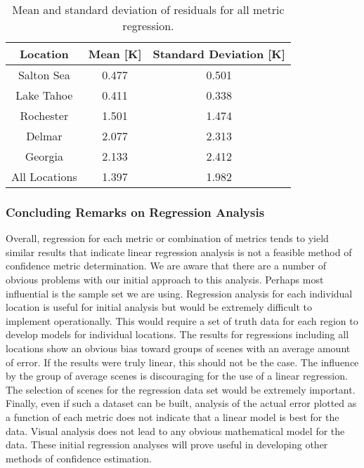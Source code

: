 \documentclass{book}
\begin{document}
\begin{table}[H]
\begin{center}
\begin{tabular}{| c | c | c |}
\hline
Location & Mean [K] & Standard Deviation [K] \\ \hline
Salton Sea & 0.477 & 0.501 \\ \hline
Lake Tahoe & 0.411 & 0.338 \\ \hline
Rochester & 1.501 & 1.474 \\ \hline
Delmar & 2.077 & 2.313 \\ \hline
Georgia & 2.133 & 2.412 \\ \hline
All Locations & 1.397 & 1.982 \\ \hline
\end{tabular}
\caption{Mean and standard deviation of residuals for all metric regression.}
\label{tab:AllResidual}
\end{center}
\end{table}

\subsubsection{Concluding Remarks on Regression Analysis}

Overall, regression for each metric or combination of metrics tends to yield similar results that indicate linear regression analysis is not a feasible method of confidence metric determination.  We are aware that there are a number of obvious problems with our initial approach to this analysis.  Perhaps most influential is the sample set we are using.  Regression analysis for each individual location is useful for initial analysis but would be extremely difficult to implement operationally.  This would require a set of truth data for each region to develop models for individual locations.  The results for regressions including all locations show an obvious bias toward groups of scenes with an average amount of error.  If the results were truly linear, this should not be the case.  The influence by the group of average scenes is discouraging for the use of a linear regression.  The selection of scenes for the regression data set would be extremely important.  Finally, even if such a dataset can be built, analysis of the actual error plotted as a function of each metric does not indicate that a linear model is best for the data.  Visual analysis does not lead to any obvious mathematical model for the data.  These initial regression analyses will prove useful in developing other methods of confidence estimation.
\end{document}
